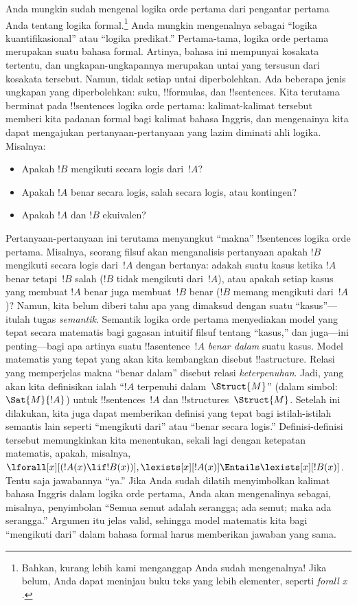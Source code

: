 \documentclass[../../../include/open-logic-section]{subfiles}
\begin{document}


Anda mungkin sudah mengenal logika orde pertama dari pengantar pertama Anda
tentang logika formal.\footnote{Bahkan, kurang lebih kami menganggap Anda
sudah mengenalnya!{} Jika belum, Anda dapat meninjau buku teks yang lebih
elementer, seperti \emph{forall x} \citep{Magnus2021}.} Anda mungkin
mengenalnya sebagai ``logika kuantifikasional'' atau ``logika predikat.''
Pertama-tama, logika orde pertama merupakan suatu bahasa formal. Artinya,
bahasa ini mempunyai kosakata tertentu, dan ungkapan-ungkapannya merupakan
untai yang tersusun dari kosakata tersebut. Namun, tidak setiap untai
diperbolehkan. Ada beberapa jenis ungkapan yang diperbolehkan: suku,
!!{formula}s, dan !!{sentence}s. Kita terutama berminat pada !!{sentence}s
logika orde pertama: kalimat-kalimat tersebut memberi kita padanan formal
bagi kalimat bahasa Inggris, dan mengenainya kita dapat mengajukan
pertanyaan-pertanyaan yang lazim diminati ahli logika. Misalnya:
\begin{itemize}
    \item Apakah $!B$ mengikuti secara logis dari~$!A$?
    \item Apakah $!A$ benar secara logis, salah secara logis, atau
kontingen?
    \item Apakah $!A$ dan $!B$ ekuivalen?
\end{itemize}

Pertanyaan-pertanyaan ini terutama menyangkut ``makna'' !!{sentence}s logika
orde pertama. Misalnya, seorang filsuf akan menganalisis pertanyaan apakah
$!B$ mengikuti secara logis dari~$!A$ dengan bertanya: adakah suatu kasus
ketika $!A$ benar tetapi~$!B$ salah ($!B$ tidak mengikuti dari~$!A$), atau
apakah setiap kasus yang membuat $!A$ benar juga membuat~$!B$ benar ($!B$
memang mengikuti dari~$!A$)? Namun, kita belum diberi tahu apa yang dimaksud
dengan suatu ``kasus''---itulah tugas \emph{semantik}. Semantik logika orde
pertama menyediakan model yang tepat secara matematis bagi gagasan intuitif
filsuf tentang ``kasus,'' dan juga---ini penting---bagi apa artinya suatu
!!a{sentence}~$!A$ \emph{benar dalam} suatu kasus. Model matematis yang tepat
yang akan kita kembangkan disebut !!a{structure}. Relasi yang memperjelas
makna ``benar dalam'' disebut relasi \emph{keterpenuhan}. Jadi, yang akan kita
definisikan ialah ``$!A$ terpenuhi dalam~$\Struct{M}$'' (dalam simbol:
$\Sat{M}{!A}$) untuk !!{sentence}s~$!A$ dan !!{structure}s~$\Struct{M}$.
Setelah ini dilakukan, kita juga dapat memberikan definisi yang tepat bagi
istilah-istilah semantis lain seperti ``mengikuti dari'' atau ``benar secara
logis.'' Definisi-definisi tersebut memungkinkan kita menentukan, sekali
lagi dengan ketepatan matematis, apakah, misalnya,
$\lforall[x][(!A(x) \lif !B(x))],
\lexists[x][!A(x)] \Entails \lexists[x][!B(x)]$. Tentu saja jawabannya
``ya.'' Jika Anda sudah dilatih menyimbolkan kalimat bahasa Inggris dalam
logika orde pertama, Anda akan mengenalinya sebagai, misalnya, penyimbolan
``Semua semut adalah serangga; ada semut; maka ada serangga.'' Argumen itu
jelas valid, sehingga model matematis kita bagi ``mengikuti dari'' dalam
bahasa formal harus memberikan jawaban yang sama.
\end{document}
